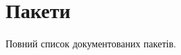 \section{Пакети}
Повний список документованих пакетів.\begin{DoxyCompactList}
\item{}
\end{DoxyCompactList}
